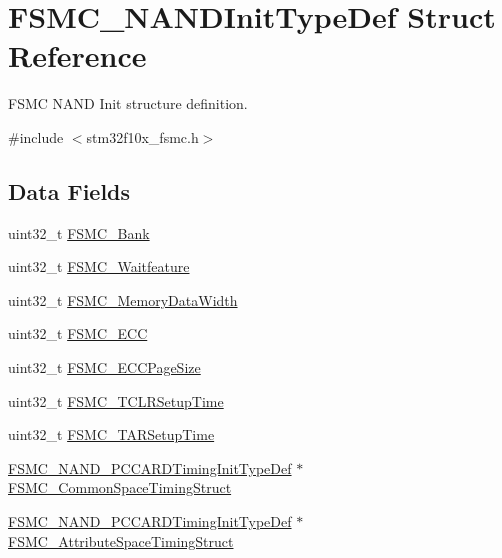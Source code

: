 \hypertarget{struct_f_s_m_c___n_a_n_d_init_type_def}{}\section{F\+S\+M\+C\+\_\+\+N\+A\+N\+D\+Init\+Type\+Def Struct Reference}
\label{struct_f_s_m_c___n_a_n_d_init_type_def}


F\+S\+MC N\+A\+ND Init structure definition.  




{\ttfamily \#include $<$stm32f10x\+\_\+fsmc.\+h$>$}

\subsection*{Data Fields}
\begin{DoxyCompactItemize}
\item 
uint32\+\_\+t \mbox{\hyperlink{struct_f_s_m_c___n_a_n_d_init_type_def_a787e4c845195c81c7326893451a2fc6f}{F\+S\+M\+C\+\_\+\+Bank}}
\item 
uint32\+\_\+t \mbox{\hyperlink{struct_f_s_m_c___n_a_n_d_init_type_def_a9ecc2cc3ec6462a8a86e545c9b8ff3cf}{F\+S\+M\+C\+\_\+\+Waitfeature}}
\item 
uint32\+\_\+t \mbox{\hyperlink{struct_f_s_m_c___n_a_n_d_init_type_def_aa89fb8c812e5ef7800eef9574dcb972d}{F\+S\+M\+C\+\_\+\+Memory\+Data\+Width}}
\item 
uint32\+\_\+t \mbox{\hyperlink{struct_f_s_m_c___n_a_n_d_init_type_def_a55c67a186e64de7086510dca7538db2a}{F\+S\+M\+C\+\_\+\+E\+CC}}
\item 
uint32\+\_\+t \mbox{\hyperlink{struct_f_s_m_c___n_a_n_d_init_type_def_a725f883015c7b7a94917b12e6dc79ee2}{F\+S\+M\+C\+\_\+\+E\+C\+C\+Page\+Size}}
\item 
uint32\+\_\+t \mbox{\hyperlink{struct_f_s_m_c___n_a_n_d_init_type_def_ab9fd4e9d4db1fc098d5f4ccffb80bf61}{F\+S\+M\+C\+\_\+\+T\+C\+L\+R\+Setup\+Time}}
\item 
uint32\+\_\+t \mbox{\hyperlink{struct_f_s_m_c___n_a_n_d_init_type_def_ab1fc3b07b6286b4974690191231f2773}{F\+S\+M\+C\+\_\+\+T\+A\+R\+Setup\+Time}}
\item 
\mbox{\hyperlink{struct_f_s_m_c___n_a_n_d___p_c_c_a_r_d_timing_init_type_def}{F\+S\+M\+C\+\_\+\+N\+A\+N\+D\+\_\+\+P\+C\+C\+A\+R\+D\+Timing\+Init\+Type\+Def}} $\ast$ \mbox{\hyperlink{struct_f_s_m_c___n_a_n_d_init_type_def_aec43dfa3b0c0ef09b02ac1b27cac92c7}{F\+S\+M\+C\+\_\+\+Common\+Space\+Timing\+Struct}}
\item 
\mbox{\hyperlink{struct_f_s_m_c___n_a_n_d___p_c_c_a_r_d_timing_init_type_def}{F\+S\+M\+C\+\_\+\+N\+A\+N\+D\+\_\+\+P\+C\+C\+A\+R\+D\+Timing\+Init\+Type\+Def}} $\ast$ \mbox{\hyperlink{struct_f_s_m_c___n_a_n_d_init_type_def_a96d5a1d02a42f194b9d5ebaae46dd3d7}{F\+S\+M\+C\+\_\+\+Attribute\+Space\+Timing\+Struct}}
\end{DoxyCompactItemize}



